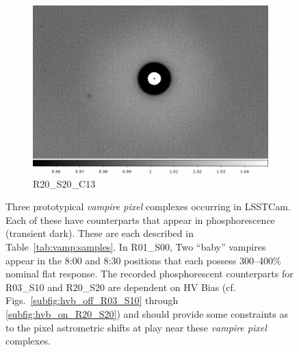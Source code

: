 \begin{figure}[!htbp]
\begin{subfigure}{0.3\textwidth}
     \includegraphics[width=\textwidth]{figures/vamp_desc/vamp_desc_ffresp_R20S20.png}
     \caption{R20\_S20\_C13}
     \label{subfig:vamp_desc_R20_S20}
 \end{subfigure}
 \newline
\caption{Three prototypical {\it vampire pixel} complexes occurring in LSSTCam. Each of these have counterparts that appear in phosphorescence (transient dark). These are each described in Table~\ref{tab:vamp:samples}. In R01\_S00, Two ``baby'' vampires appear in the 8:00 and 8:30 positions that each possess 300--400\% nominal flat response. The recorded phosphorescent counterparts for R03\_S10 and R20\_S20 are dependent on HV Bias (cf. Figs.~\ref{subfig:hvb_off_R03_S10} through \ref{subfig:hvb_on_R20_S20}) and should provide some constraints as to the pixel astrometric shifts at play near these {\it vampire pixel} complexes.}
\label{fig:vamp:ffresp}
\end{figure}



